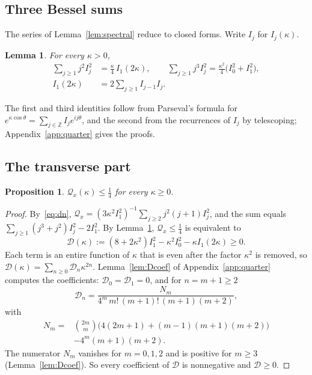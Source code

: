 \documentclass[aps,prd,twocolumn,superscriptaddress,nofootinbib,longbibliography,floatfix,amsmath,amssymb,10pt]{revtex4-2}
\newtheorem{lemma}[theorem]{Lemma}
\newtheorem{proposition}[theorem]{Proposition}
\theoremstyle{definition}
\theoremstyle{remark}
\newcommand{\Z}{\mathbb{Z}}
\begin{document}
\subsection{Three Bessel sums}

The series of Lemma~\ref{lem:spectral} reduce to closed forms. Write $I_j$
for $I_j(\kappa)$.

\begin{lemma}\label{lem:besselsums}
For every $\kappa>0$,
\begin{align*}
\sum_{j\ge1}j^2I_j^2&=\frac\kappa4\,I_1(2\kappa),\qquad
\sum_{j\ge1}j^3I_j^2=\frac{\kappa^2}4\bigl(I_0^2+I_1^2\bigr),\\
I_1(2\kappa)&=2\sum_{j\ge1}I_{j-1}I_j .
\end{align*}
\end{lemma}

The first and third identities follow from Parseval's formula for
$e^{\kappa\cos\theta}=\sum_{j\in\Z}I_je^{ij\theta}$, and the second from the
recurrences of $I_j$ by telescoping; Appendix~\ref{app:quarter} gives the
proofs.

\subsection{The transverse part}

\begin{proposition}\label{prop:transverse}
$\mathcal Q_x(\kappa)\le\frac14$ for every $\kappa\ge0$.
\end{proposition}

\begin{proof}
By~\eqref{eq:dn}, $\mathcal Q_x=(3\kappa^2I_1^2)^{-1}\sum_{j\ge2}j^2(j+1)
I_j^2$, and the sum equals $\sum_{j\ge1}(j^3+j^2)I_j^2-2I_1^2$. By
Lemma~\ref{lem:besselsums}, $\mathcal Q_x\le\frac14$ is equivalent to
\begin{equation}\label{eq:Dfunction}
\mathcal D(\kappa):=(8+2\kappa^2)I_1^2-\kappa^2I_0^2-\kappa I_1(2\kappa)\ge0 .
\end{equation}
Each term is an entire function of $\kappa$ that is even after the
factor $\kappa^2$ is removed, so $\mathcal D(\kappa)=\sum_{n\ge0}\mathcal D_n
\kappa^{2n}$. Lemma~\ref{lem:Dcoef} of Appendix~\ref{app:quarter} computes the
coefficients: $\mathcal D_0=\mathcal D_1=0$, and for $n=m+1\ge2$
\[
\mathcal D_n=\frac{N_m}{4^m\,m!\,(m+1)!\,(m+1)(m+2)},
\]
with
\[
\begin{aligned}
N_m={}&\binom{2m}m\bigl(4(2m+1)+(m-1)(m+1)(m+2)\bigr)\\
&-4^m(m+1)(m+2).
\end{aligned}
\]
The numerator $N_m$ vanishes for $m=0,1,2$ and is positive for $m\ge3$
(Lemma~\ref{lem:Dcoef}). So every coefficient of $\mathcal D$ is nonnegative
and $\mathcal D\ge0$.
\end{proof}
\end{document}
